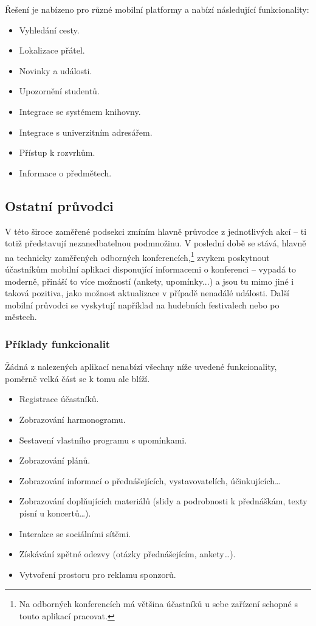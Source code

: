 Řešení je nabízeno pro různé mobilní platformy a nabízí následující funkcionality:
\begin{itemize}
\item Vyhledání cesty.
\item Lokalizace přátel.
\item Novinky a události.
\item Upozornění studentů.
\item Integrace se systémem knihovny.
\item Integrace s univerzitním adresářem.
\item Přístup k rozvrhům.
\item Informace o předmětech.
\end{itemize}

\subsection{Ostatní průvodci}
V této široce zaměřené podsekci zmíním hlavně průvodce z jednotlivých akcí -- ti totiž představují nezanedbatelnou podmnožinu. V poslední době se stává, hlavně na technicky zaměřených odborných konferencích,\footnote{Na odborných konferencích má většina účastníků u sebe zařízení schopné s touto aplikací pracovat.} zvykem poskytnout účastníkům mobilní aplikaci disponující informacemi o konferenci -- vypadá to moderně, přináší to více možností (ankety, upomínky...) a jsou tu mimo jiné i taková pozitiva, jako možnost aktualizace v případě nenadálé události. Další mobilní průvodci se vyskytují například na hudebních festivalech nebo po městech.

\subsubsection{Příklady funkcionalit}
Žádná z nalezených aplikací nenabízí všechny níže uvedené funkcionality, poměrně velká část se k tomu ale blíží.
\begin{itemize}
\item Registrace účastníků.
\item Zobrazování harmonogramu.
\item Sestavení vlastního programu s upomínkami.
\item Zobrazování plánů.
\item Zobrazování informací o přednášejících, vystavovatelích, účinkujících\dots
\item Zobrazování doplňujících materiálů (slidy a podrobnosti k přednáškám, texty písní u koncertů\dots).
\item Interakce se sociálními sítěmi.
\item Získávání zpětné odezvy (otázky přednášejícím, ankety\dots).
\item Vytvoření prostoru pro reklamu sponzorů. 
\end{itemize}

